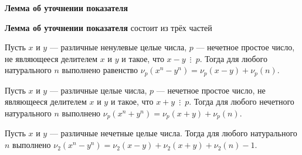 \documentclass{article}
\begin{document}
    \large

    \begin{center}
        \textbf{Лемма об уточнении показателя}
    \end{center}

    \textbf{Лемма об уточнении показателя } состоит из трёх частей

    Пусть $x$ и $y$ — различные ненулевые целые числа, $p$ — нечетное простое число, не являющееся делителем $x$ и $y$ и такое, что $x - y \,\,\,\vdots\,\,\, p$.
    Тогда для любого натурального $n$ выполнено равенство $\nu_p (x^n - y^n) = \nu_p (x - y) + \nu_p(n).$

    Пусть $x$ и $y$ — различные целые числа, $p$ — нечетное простое число, не являющееся делителем $x$ и $y$ и такое, что $x + y \,\,\,\vdots\,\,\, p$.
    Тогда для любого нечетного натурального $n$ выполнено $\nu_p (x^n + y^n) = \nu_p(x + y) + \nu_p (n).$

    Пусть $x$ и $y$ — различные нечетные целые числа.
    Тогда для любого натурального $n$ выполнено $\nu_2 (x^n - y^n)  = \nu_2 (x - y) + \nu_2 (x + y) + \nu_2 (n) - 1.$
\end{document}
